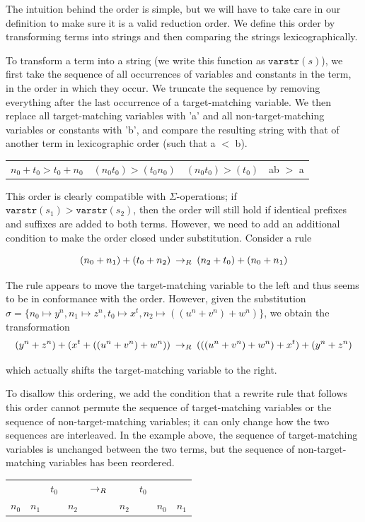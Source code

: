 The intuition behind the order is simple, but we will have to take care in our definition to make sure it is a valid reduction order. We define this order by transforming terms into strings and then comparing the strings lexicographically.

To transform a term into a string (we write this function as $\texttt{varstr}(s)$), we first take the sequence of all occurrences of variables and constants in the term, in the order in which they occur. We truncate the sequence by removing everything after the last occurrence of a target-matching variable. We then replace all target-matching variables with 'a' and all non-target-matching variables or constants with 'b', and compare the resulting string with that of another term in lexicographic order (such that a $<$ b).

\begin{tabular}{llll}
$n_0 + t_0 > t_0 + n_0$ & $(n_0 t_0) > (t_0 n_0)$ & $(n_0 t_0) > (t_0)$ & ab $>$ a \\
\end{tabular}

This order is clearly compatible with $\Sigma$-operations; if $\texttt{varstr}(s_1) > \texttt{varstr}(s_2)$, then the order will still hold if identical prefixes and suffixes are added to both terms. However, we need to add an additional condition to make the order closed under substitution. Consider a rule

\[ (n_0 + n_1) + (t_0 + n_2) \:\rightarrow_{R}\: (n_2 + t_0) + (n_0 + n_1)
\]

The rule appears to move the target-matching variable to the left and thus seems to be in conformance with the order. However, given the substitution $\sigma = \{ n_0 \mapsto y^n, n_1 \mapsto z^n, t_0 \mapsto x^t, n_2 \mapsto ((u^n + v^n) + w^n)\}$, we obtain the transformation
\[ (y^n + z^n) + (x^t + ((u^n + v^n) + w^n)) \:\rightarrow_{R}\: (((u^n + v^n) + w^n) + x^t) + (y^n + z^n)
\]

which actually shifts the target-matching variable to the right.

To disallow this ordering, we add the condition that a rewrite rule that follows this order cannot permute the sequence of target-matching variables or the sequence of non-target-matching variables; it can only change how the two sequences are interleaved. In the example above, the sequence of target-matching variables is unchanged between the two terms, but the sequence of non-target-matching variables has been reordered.

\begin{tabular}{ccccccccc}
      &       & $t_0$ &       & $\:\rightarrow_{R}\:$ &       & $t_0$ &       & \\
$n_0$ & $n_1$ &       & $n_2$ &             & $n_2$ &       & $n_0$ & $n_1$
\end{tabular}

